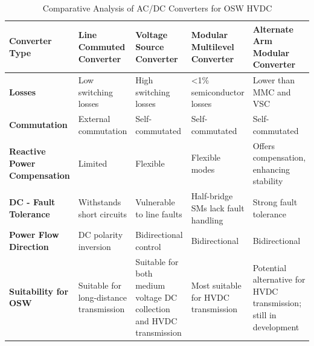 \documentclass{ieeeaccess}
\begin{document}
\begin{table}[htbp]
\renewcommand{\arrayrulewidth}{1.1pt} %
\renewcommand{\arraystretch}{1.2} %
\renewcommand{\tabcolsep}{5pt}
\small
\caption{Comparative Analysis of AC/DC Converters for OSW HVDC}
\centering
\label{Comparative Analysis of Converter for OSW HVDC}
\begin{tabular}{|
>{\raggedright\arraybackslash}p{2.6cm}|
>{\raggedright\arraybackslash}p{2.9cm}|
>{\raggedright\arraybackslash}p{2.9cm}|
>{\raggedright\arraybackslash}p{2.9cm}|
>{\raggedright\arraybackslash}p{2.9cm}|}
\hline
\textbf{Converter Type} & 
\textbf{Line Commuted Converter} & 
\textbf{Voltage Source Converter} & 
\textbf{Modular Multilevel Converter} & 
\textbf{Alternate Arm Modular Converter} \\
\hline

\textbf{Losses} & 
Low switching losses \cite{oni2016review} & 
High switching losses \cite{oni2016review, spahic2005offshore} &  
\textless{}1\% semiconductor losses \cite{debnath2014operation} & 
Lower than MMC and VSC \cite{merlin2013alternate} \\
\hline

\textbf{Commutation} & 
External commutation \cite{oni2016review} & 
Self-commutated & 
Self-commutated & 
Self-commutated \\
\hline

\textbf{Reactive Power Compensation} & 
Limited \cite{xue2016reactive, buigues2017present} & 
Flexible \cite{oni2016review} & 
Flexible modes \cite{yu2021bpa} & 
Offers compensation, enhancing stability \cite{merlin2013alternate} \\
\hline

\textbf{DC - Fault Tolerance} & 
Withstands short circuits \cite{flourentzou2009vsc} & 
Vulnerable to line faults \cite{flourentzou2009vsc, soomro2022detailed} & 
Half-bridge SMs lack fault handling \cite{merlin2013alternate} & 
Strong fault tolerance \cite{wickramasinghe2018alternate, sun2021hybrid} \\
\hline

\textbf{Power Flow Direction} & 
DC polarity inversion \cite{oni2016review} & 
Bidirectional control \cite{spahic2005offshore} & 
Bidirectional \cite{yu2021bpa, sun2021hybrid} & 
Bidirectional \cite{sun2021hybrid} \\
\hline

\textbf{Suitability for OSW} & 
Suitable for long-distance transmission \cite{oni2016review} & 
Suitable for both medium voltage DC collection and HVDC transmission \cite{oni2016review, flourentzou2009vsc} & 
Most suitable for HVDC transmission \cite{li2019coordinated} & 
Potential alternative for HVDC transmission; still in development \cite{merlin2013alternate} \\
\hline


\end{tabular}
\end{table}
\end{document}
